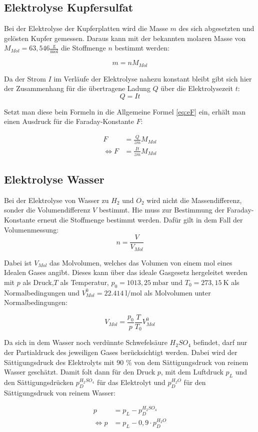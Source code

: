 \subsection{Elektrolyse Kupfersulfat}
Bei der Elektrolyse der Kupferplatten wird die Masse $m$ des sich abgesetzten und gelösten Kupfer gemessen.
Daraus kann mit der bekannten molaren Masse von $M_{Mol} = 63,546 \tfrac{\text{g}}{\text{mol}}$ die Stoffmenge $n$ bestimmt werden:

\begin{equation}
    m = nM_{Mol}
\end{equation}

Da der Strom $I$ im Verläufe der Elektrolyse nahezu konstant bleibt gibt sich hier der Zusammenhang für die übertragene Ladung $Q$
über die Elektrolysezeit $t$:
\begin{equation}
    Q = It
\end{equation}

Setzt man diese bein Formeln in die Allgemeine Formel \ref{eq:eF} ein, erhält man einen Ausdruck für die Faraday-Konstante $F$:

\begin{align}
    F &= \frac{Q}{zm}M_{Mol} \\
    \Leftrightarrow F &=  \frac{It}{zm}M_{Mol}
    \label{eq:FCu}
\end{align}


\subsection{Elektrolyse Wasser}

Bei der Elektrolyse von Wasser zu $H_2$ und $O_2$ wird nicht die Massendifferenz, sonder die Volumendifferenz $V$ bestimmt.
Hie muss zur Bestimmung der Faraday-Konstante erneut die Stoffmenge bestimmt werden.
Dafür gilt in dem Fall der Volumenmessung:
\begin{equation}
    n = \frac{V}{V_{Mol}}
\end{equation}

Dabei ist $V_{Mol}$ das Molvolumen, welches das Volumen von einem mol eines Idealen Gases angibt.
Dieses kann über das ideale Gasgesetz hergeleitet werden mit $p$ als Druck,$T$ als Temperatur,
$p_0 = 1013,25\  \text{mbar}$ und $T_0 = 273,15\ \text{K}$ als Normalbedingungen und $V_{Mol}^0 = \SI{22,414}{\litre \per \mole}$ als Molvolumen unter Normalbedingungen:

\begin{equation}
    V_{Mol} = \frac{p_0}{p}\frac{T}{T_0}V_{Mol}^0
\end{equation}

Da sich in dem Wasser noch verdünnte Schwefelsäure $H_2SO_4$ befindet, darf nur der
Partialdruck des jeweiligen Gases berücksichtigt werden. Dabei wird der Sättigungsdruck des Elektrolyts
mit 90 \% von dem Sättigungsdruck von reinem Wasser geschätzt.
Damit folt dann für den Druck $p$, mit dem Luftdruck $p_L$ und den Sättigungsdrücken
$p_D^{H_2SO_4}$ für das Elektrolyt und $p_D^{H_2O}$ für den Sättigungsdruck von reinem Wasser:

\begin{align}
    p &= p_L - p_D^{H_2SO_4}\\
    \Leftrightarrow p &= p_L - 0,9 \cdot p_D^{H_2O}
\end{align}